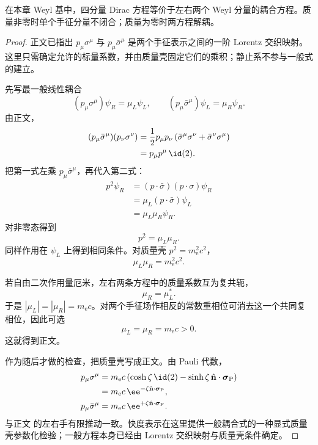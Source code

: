 \begin{proposition}
在本章 Weyl 基中，四分量 Dirac 方程等价于左右两个 Weyl 分量的耦合方程。质量非零时单个手征分量不闭合；质量为零时两方程解耦。
\end{proposition}
\begin{proof}
正文已指出 $p_\mu\sigma^\mu$ 与 $p_\mu\bar\sigma^\mu$ 是两个手征表示之间的一阶 Lorentz 交织映射。这里只需确定允许的标量系数，并由质量壳固定它们的乘积；静止系不参与一般式的建立。

先写最一般线性耦合
\begin{equation*}
 (p_\mu\sigma^\mu)\psi_R=\mu_L\psi_L,
 \qquad
 (p_\mu\bar\sigma^\mu)\psi_L=\mu_R\psi_R.
\end{equation*}
由正文，
\begin{align*}
 (p_\mu\bar\sigma^\mu)(p_\nu\sigma^\nu)
 &=\frac12p_\mu p_\nu
 \left(\bar\sigma^\mu\sigma^\nu+\bar\sigma^\nu\sigma^\mu\right)\\
 &=p_\mu p^\mu\,\id(2).
\end{align*}
把第一式左乘 $p_\mu\bar\sigma^\mu$，再代入第二式：
\begin{align*}
 p^2\psi_R
 &=(p\!\cdot\!\bar\sigma)(p\!\cdot\!\sigma)\psi_R\\
 &=\mu_L(p\!\cdot\!\bar\sigma)\psi_L\\
 &=\mu_L\mu_R\psi_R.
\end{align*}
对非零态得到
\begin{equation*}
 p^2=\mu_L\mu_R.
\end{equation*}
同样作用在 $\psi_L$ 上得到相同条件。对质量壳 $p^2=m_{\mathrm e}^2c^2$，
\begin{equation*}
 \mu_L\mu_R=m_{\mathrm e}^2c^2.
\end{equation*}

若自由二次作用量厄米，左右两条方程中的质量系数互为复共轭，
\begin{equation*}
 \mu_R=\mu_L^*.
\end{equation*}
于是 $|\mu_L|=|\mu_R|=m_{\mathrm e} c$。对两个手征场作相反的常数重相位可消去这一个共同复相位，因此可选
\begin{equation*}
 \mu_L=\mu_R=m_{\mathrm e} c>0.
\end{equation*}
这就得到正文。

作为随后才做的检查，把质量壳写成正文。由 Pauli 代数，
\begin{align*}
 p_\mu\sigma^\mu
 &=m_{\mathrm e} c\left(\cosh\zeta\,\id(2)
 -\sinh\zeta\,\hat{\mathbf n}\cdot\boldsymbol\sigma_{\rm P}\right)\\
 &=m_{\mathrm e} c\,\ee^{-\zeta\hat{\mathbf n}\cdot\boldsymbol\sigma_{\rm P}},\\
 p_\mu\bar\sigma^\mu
 &=m_{\mathrm e} c\,\ee^{+\zeta\hat{\mathbf n}\cdot\boldsymbol\sigma_{\rm P}}.
\end{align*}
与正文 的左右手有限推动一致。快度表示在这里提供一般耦合式的一种显式质量壳参数化检验；一般方程本身已经由 Lorentz 交织映射与质量壳条件确定。
\end{proof}

